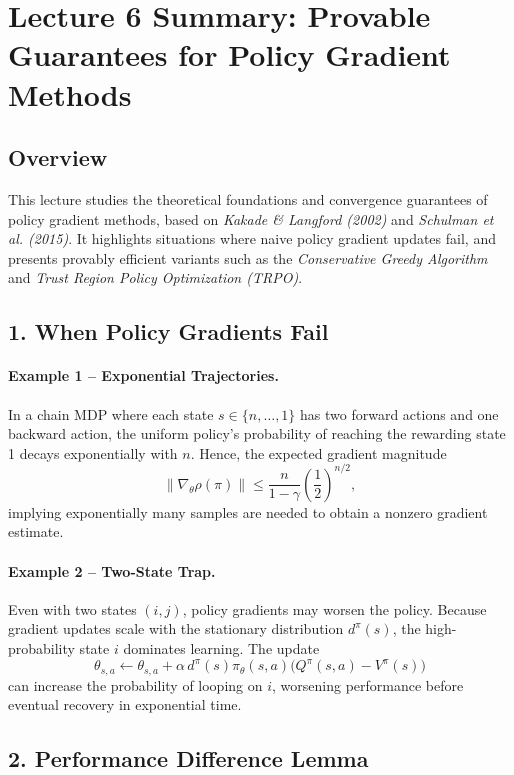 \documentclass[12pt]{article}
\begin{document}
\psetheader %

\section*{Lecture 6 Summary: Provable Guarantees for Policy Gradient Methods}

\subsection*{Overview}
This lecture studies the theoretical foundations and convergence guarantees of policy
gradient methods, based on \textit{Kakade \& Langford (2002)} and \textit{Schulman et al.
(2015)}. It highlights situations where naive policy gradient updates fail, and presents
provably efficient variants such as the \emph{Conservative Greedy Algorithm} and
\emph{Trust Region Policy Optimization (TRPO)}.

\subsection*{1. When Policy Gradients Fail}

\paragraph{Example 1 – Exponential Trajectories.}
In a chain MDP where each state $s \in \{n,\dots,1\}$ has two forward actions and one
backward action, the uniform policy’s probability of reaching the rewarding state 1
decays exponentially with $n$.
Hence, the expected gradient magnitude
\[
		\|\nabla_\theta \rho(\pi)\| \le \frac{n}{1-\gamma}\left(\frac{1}{2}\right)^{n/2},
\]
implying exponentially many samples are needed to obtain a nonzero gradient estimate.

\paragraph{Example 2 – Two-State Trap.}
Even with two states $(i,j)$, policy gradients may worsen the policy.
Because gradient updates scale with the stationary distribution $d^\pi(s)$,
the high-probability state $i$ dominates learning.
The update
\[
		\theta_{s,a} \leftarrow \theta_{s,a} + \alpha\,
		d^\pi(s)\pi_\theta(s,a)\big(Q^\pi(s,a)-V^\pi(s)\big)
\]
can increase the probability of looping on $i$, worsening performance before eventual
recovery in exponential time.

\subsection*{2. Performance Difference Lemma}
\end{document}
